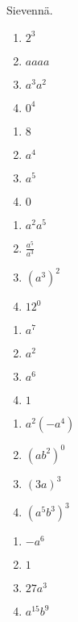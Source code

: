 	Sievennä.
    \begin{tehtava}%
		\begin{enumerate}
        	\item $2^3 $ 
        	\item $aaaa$ 
        	\item $a^3a^2$ 
        	\item $0^4$
		\end{enumerate}        
        \begin{vastaus}
        \begin{enumerate}
            \item $8$ 
            \item $a^4$ 
            \item $a^5$ 
            \item $0$
        \end{enumerate}
        \end{vastaus}
    \end{tehtava}

    \begin{tehtava}%
        \begin{enumerate}
        	\item $a^2a^5 $ 
        	\item $\frac{a^5}{a^3}$ 
        	\item $(a^3)^2$ 
        	\item $12^0$
		\end{enumerate}        
        \begin{vastaus}
        \begin{enumerate}
            \item $a^7$ 
            \item $a^2$ 
            \item $a^6$ 
            \item $1$
        \end{enumerate}
        \end{vastaus}
    \end{tehtava}    
    
        
    \begin{tehtava}%
        \begin{enumerate}
        	\item $a^2(-a^4) $ 
        	\item $(ab^2)^0$ 
        	\item $(3a)^3$ 
        	\item $(a^5b^3)^3$
		\end{enumerate}        
        \begin{vastaus}
        \begin{enumerate}
            \item $-a^6$ 
            \item $1$ 
            \item $27a^3$ 
            \item $a^{15}b^9$
        \end{enumerate}
        \end{vastaus}
    \end{tehtava} 
    
